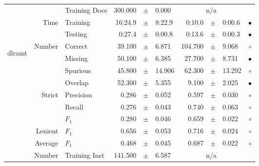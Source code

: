 \begin{longtable}{|r|r|l||rcl|rcl|c|}
\cline{3-10} &                             &   Training Docs &     300.000 &  $\pm$  &       0.000 &    \multicolumn{3}{c|}{n/a}         &  \\
\cline{2-10} & \multirow{2}{*}{      Time} &        Training &     16:24.9 &  $\pm$  &      8:22.9 &      0:10.0 &  $\pm$  &      0:00.6 & $\bullet$ \\
\cline{3-10} &                             &         Testing &      0:27.4 &  $\pm$  &      0:00.8 &      0:13.6 &  $\pm$  &      0:00.3 & $\bullet$ \\
\hline
\hline
\multirow{11}{*}{\begin{sideways}dlramt\end{sideways} }
             & \multirow{4}{*}{    Number} &         Correct &      39.100 &  $\pm$  &       6.871 &     104.700 &  $\pm$  &       9.068 & $\circ$ \\
\cline{3-10} &                             &         Missing &      50.100 &  $\pm$  &       6.385 &      27.700 &  $\pm$  &       8.731 & $\bullet$ \\
\cline{3-10} &                             &        Spurious &      45.800 &  $\pm$  &      14.906 &      62.300 &  $\pm$  &      13.292 & $\circ$ \\
\cline{3-10} &                             &         Overlap &      52.300 &  $\pm$  &       5.355 &       9.100 &  $\pm$  &       2.025 & $\bullet$ \\
\cline{2-10} & \multirow{3}{*}{    Strict} &       Precision &       0.286 &  $\pm$  &       0.052 &       0.597 &  $\pm$  &       0.030 & $\circ$ \\
\cline{3-10} &                             &          Recall &       0.276 &  $\pm$  &       0.043 &       0.740 &  $\pm$  &       0.063 & $\circ$ \\
\cline{3-10} &                             &           $F_1$ &       0.280 &  $\pm$  &       0.046 &       0.659 &  $\pm$  &       0.022 & $\circ$ \\
\cline{2-10} &                     Lenient &           $F_1$ &       0.656 &  $\pm$  &       0.053 &       0.716 &  $\pm$  &       0.024 & $\circ$ \\
\cline{2-10} &                     Average &           $F_1$ &       0.468 &  $\pm$  &       0.045 &       0.687 &  $\pm$  &       0.022 & $\circ$ \\
\cline{2-10} & \multirow{2}{*}{    Number} &   Training Inst &     141.500 &  $\pm$  &       6.587 &    \multicolumn{3}{c|}{n/a}         &  \\

\end{longtable}

